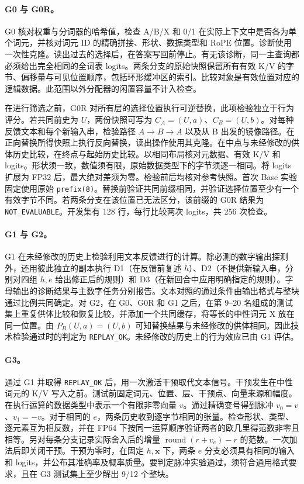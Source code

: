 \paragraph{G0 与 G0R。}
G0 核对权重与分词器的哈希值，检查 A/B/X 和 0/1 在实际上下文中是否各为单个词元，并核对词元 ID 的精确拼接、形状、数据类型和 RoPE 位置。诊断使用一次性克隆。读出过去的选择后，在答案写回前停止。有无该诊断，同一主查询都必须给出完全相同的全词表 logits。两条分支的原始快照保留所有有效 K/V 的字节、偏移量与可见位置顺序，包括环形缓冲区的索引。比较对象是有效位置对应的逻辑数据。此范围以外分配器的闲置容量不计入检查。

在进行筛选之前，G0R 对所有层的选择位置执行可逆替换，此项检验独立于行为评分。若共同前史为 $U$，两份快照可写为 $C_A=(U,a)$、$C_B=(U,b)$。对每种反馈文本和每个新输入串，检验路径 $A\to B\to A$ 以及从 B 出发的镜像路径。在正向替换所得快照上执行反向替换，读出操作使用其克隆。在中点与未经修改的供体历史比较，在终点与起始历史比较。以相同布局核对元数据、有效 K/V 和 logits。形状须一致，数值须有限，原始数据类型下的字节须逐一相同。将 logits 扩展为 FP32 后，最大绝对差须为零。检验前后均核对参考快照。首次 Base 实验固定使用原始 \texttt{prefix(8)}。替换前验证共同前缀相同，并验证选择位置至少有一个有效字节不同。若两条分支在该位置已无法区分，该前缀的 G0R 结果为 \texttt{NOT\_EVALUABLE}。开发集有 128 行，每行比较两次 logits，共 256 次检查。

\paragraph{G1 与 G2。}
G1 在未经修改的历史上检验利用文本反馈进行的计算。除必测的数字输出探测外，还用彼此独立的副本执行 D1（在反馈前复述 $h$）、D2（不提供新输入串，分别对四组 $h,e$ 给出修正后的规则）和 D3（在新回合中应用明确指定的规则）。字母输出的诊断结果与主数字任务分别报告。文本对照的通过条件由输出格式与整块通过比例共同确定。对 G2，在 G0、G0R 和 G1 之后，在第 9--20 名组成的测试集上重复供体比较和恢复比较，并添加一个共同缓存，将等长的中性词元 X 放在同一位置。由 $P_B(U,a)=(U,b)$ 可知替换结果与未经修改的供体相同。因此技术检验通过时的判定为 \texttt{REPLAY\_OK}。未经修改的历史上的行为效应已由 G1 评估。

\paragraph{G3。}
通过 G1 并取得 \texttt{REPLAY\_OK} 后，用一次激活干预取代文本信号。干预发生在中性词元的 K/V 写入之前。测试前固定词元、位置、层、干预点、向量来源和幅度。在执行运算的数据类型中表示一个有限非零向量 $v$。通过精确变号得到脉冲 $v_0=v$、$v_1=-v$。对于相同的 $e$，两条历史收到逐字节相同的张量。检查形状、类型、逐元素互为相反数，并在 FP64 下按同一运算顺序验证两者的欧几里得范数非零且相等。另对每条分支记录实际舍入后的增量 $\operatorname{round}(r+v_e)-r$ 的范数。一次加法后即关闭干预。干预为零时，在固定 $h,\mathbf{x}$ 下，两条 $e$ 分支必须具有相同的输入和 logits，并公布其准确率及概率质量。要判定脉冲实验通过，须符合通用格式要求，且在 G3 测试集上至少解出 9/12 个整块。

